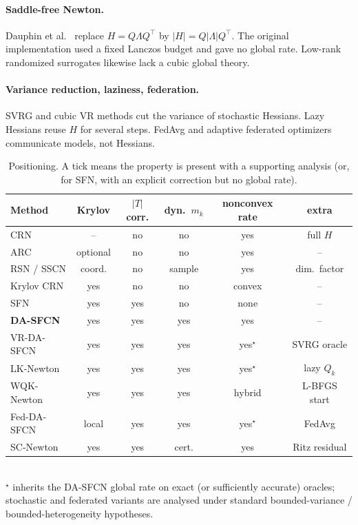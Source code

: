\documentclass[11pt,a4paper]{article}
\theoremstyle{definition}
\begin{document}
\paragraph{Saddle-free Newton.}
Dauphin et al.\ \cite{dauphin2014} replace $H=Q\Lambda Q^\top$ by
$|H|=Q|\Lambda|Q^\top$. The original implementation used a fixed Lanczos
budget and gave no global rate. Low-rank randomized surrogates
\cite{oleary2020} likewise lack a cubic global theory.

\paragraph{Variance reduction, laziness, federation.}
SVRG \cite{johnson2013} and cubic VR methods \cite{tripuraneni2018,
pasechnyuk2025} cut the variance of stochastic Hessians.
Lazy Hessians \cite{doikov2023} reuse $H$ for several steps.
FedAvg \cite{mcmahan2017} and adaptive federated optimizers
\cite{reddi2021} communicate models, not Hessians.

\begin{table}[t]
\centering
\caption{Positioning. A tick means the property is present with a supporting
analysis (or, for SFN, with an explicit correction but no global rate).}
\label{tab:gap}
\small
\begin{tabular}{@{}lccccc@{}}
\toprule
Method & Krylov & $|T|$ corr. & dyn.\ $m_k$ & nonconvex rate & extra \\
\midrule
CRN \cite{nesterov2006} & -- & no & no & yes & full $H$ \\
ARC \cite{cartis2011} & optional & no & no & yes & -- \\
RSN / SSCN \cite{gower2019,zhao2025} & coord. & no & sample & yes & dim.\ factor \\
Krylov CRN \cite{jiang2024} & yes & no & no & convex & -- \\
SFN \cite{dauphin2014} & yes & yes & no & none & -- \\
\textbf{DA-SFCN} & yes & yes & yes & yes & -- \\
VR-DA-SFCN & yes & yes & yes & yes$^\star$ & SVRG oracle \\
LK-Newton & yes & yes & yes & yes$^\star$ & lazy $Q_k$ \\
WQK-Newton & yes & yes & yes & hybrid & L-BFGS start \\
Fed-DA-SFCN & local & yes & yes & yes$^\star$ & FedAvg \\
SC-Newton & yes & yes & cert. & yes & Ritz residual \\
\bottomrule
\end{tabular}\\[2pt]
{\small $^\star$ inherits the DA-SFCN global rate on exact (or sufficiently
accurate) oracles; stochastic and federated variants are analysed under
standard bounded-variance / bounded-heterogeneity hypotheses.}
\end{table}
\end{document}
